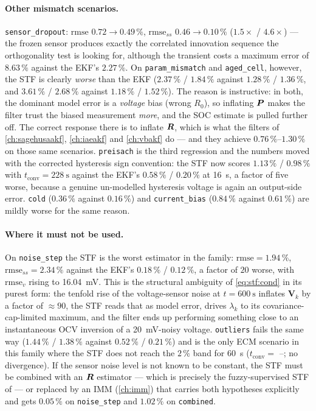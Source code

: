 \paragraph{Other mismatch scenarios.}  \texttt{sensor\_dropout}: $\mathrm{rmse}$ $0.72\to0.49\,\%$,
$\mathrm{rmse}_{ss}$ $0.46\to0.10\,\%$ ($1.5\times$ / $4.6\times$) --- the frozen sensor produces
exactly the correlated innovation sequence the orthogonality test is looking for, although the
transient costs a maximum error of $8.63\,\%$ against the EKF's $2.27\,\%$.  On
\texttt{param\_mismatch} and \texttt{aged\_cell}, however, the STF is clearly \emph{worse} than the
EKF ($2.37\,\%$ / $1.84\,\%$ against $1.28\,\%$ / $1.36\,\%$, and $3.61\,\%$ / $2.68\,\%$ against
$1.18\,\%$ / $1.52\,\%$).  The reason is instructive: in both, the dominant model error is a
\emph{voltage} bias (wrong $R_0$), so inflating $\bm{P}$ makes the filter trust the biased measurement
\emph{more}, and the SOC estimate is pulled further off.  The correct response there is to inflate
$\bm{R}$, which is what the filters of \cref{ch:sagehusaakf}, \cref{ch:iaeakf} and \cref{ch:vbakf} do
--- and they achieve $0.76\,\%$--$1.30\,\%$ on those same scenarios.  \texttt{preisach} is the third
regression and the numbers moved with the corrected hysteresis sign convention: the STF now scores
$1.13\,\%$ / $0.98\,\%$ with $t_\mathrm{conv}=\SI{228}{\second}$ against the EKF's $0.58\,\%$ /
$0.20\,\%$ at \SI{16}{\second}, a factor of five worse, because a genuine un-modelled hysteresis
voltage is again an output-side error.  \texttt{cold} ($0.36\,\%$ against $0.16\,\%$) and
\texttt{current\_bias} ($0.84\,\%$ against $0.61\,\%$) are mildly worse for the same reason.

\paragraph{Where it must not be used.}  On \texttt{noise\_step} the STF is the worst estimator in the
family: $\mathrm{rmse}=1.94\,\%$, $\mathrm{rmse}_{ss}=2.34\,\%$ against the EKF's $0.18\,\%$ /
$0.12\,\%$, a factor of $20$ worse, with $\mathrm{rmse}_v$ rising to \SI{16.04}{\milli\volt}.  This is
the structural ambiguity of \eqref{eq:stf:cond} in its purest form: the tenfold rise of the
voltage-sensor noise at $t=\SI{600}{\second}$ inflates $\bm{V}_k$ by a factor of $\approx90$, the STF
reads that as model error, drives $\lambda_k$ to its covariance-cap-limited maximum, and the filter
ends up performing something close to an instantaneous OCV inversion of a \SI{20}{\milli\volt}-noisy
voltage.  \texttt{outliers} fails the same way ($1.44\,\%$ / $1.38\,\%$ against $0.52\,\%$ /
$0.21\,\%$) and is the only ECM scenario in this family where the STF does not reach the $2\,\%$ band
for \SI{60}{\second} ($t_\mathrm{conv}=$ --; no divergence).  If the sensor noise level is not known
to be constant, the STF must be combined with an $\bm{R}$ estimator --- which is precisely the
fuzzy-supervised STF of \cite{jwo2007fuzzy} --- or replaced by an IMM (\cref{ch:imm}) that carries
both hypotheses explicitly and gets $0.05\,\%$ on \texttt{noise\_step} and $1.02\,\%$ on
\texttt{combined}.

